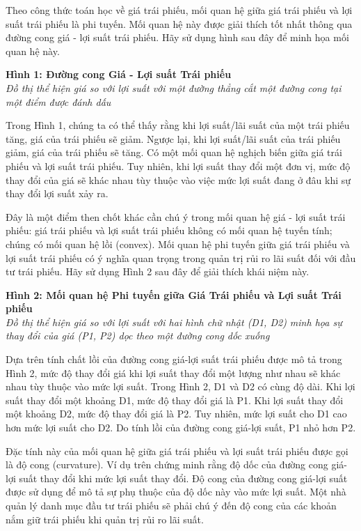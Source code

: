 Theo công thức toán học về giá trái phiếu, mối quan hệ giữa giá trái phiếu và lợi suất trái phiếu là phi tuyến. Mối quan hệ này được giải thích tốt nhất thông qua đường cong giá - lợi suất trái phiếu. Hãy sử dụng hình sau đây để minh họa mối quan hệ này.

\textbf{Hình 1: Đường cong Giá - Lợi suất Trái phiếu} \\
\textit{Đồ thị thể hiện giá so với lợi suất với một đường thẳng cắt một đường cong tại một điểm được đánh dấu}

Trong Hình 1, chúng ta có thể thấy rằng khi lợi suất/lãi suất của một trái phiếu tăng, giá của trái phiếu sẽ giảm. Ngược lại, khi lợi suất/lãi suất của trái phiếu giảm, giá của trái phiếu sẽ tăng. Có một mối quan hệ nghịch biến giữa giá trái phiếu và lợi suất trái phiếu. Tuy nhiên, khi lợi suất thay đổi một đơn vị, mức độ thay đổi của giá sẽ khác nhau tùy thuộc vào việc mức lợi suất đang ở đâu khi sự thay đổi lợi suất xảy ra.

Đây là một điểm then chốt khác cần chú ý trong mối quan hệ giá - lợi suất trái phiếu: giá trái phiếu và lợi suất trái phiếu không có mối quan hệ tuyến tính; chúng có mối quan hệ lồi (convex). Mối quan hệ phi tuyến giữa giá trái phiếu và lợi suất trái phiếu có ý nghĩa quan trọng trong quản trị rủi ro lãi suất đối với đầu tư trái phiếu. Hãy sử dụng Hình 2 sau đây để giải thích khái niệm này.

\textbf{Hình 2: Mối quan hệ Phi tuyến giữa Giá Trái phiếu và Lợi suất Trái phiếu} \\
\textit{Đồ thị thể hiện giá so với lợi suất với hai hình chữ nhật (D1, D2) minh họa sự thay đổi của giá (P1, P2) dọc theo một đường cong dốc xuống}

Dựa trên tính chất lồi của đường cong giá-lợi suất trái phiếu được mô tả trong Hình 2, mức độ thay đổi giá khi lợi suất thay đổi một lượng như nhau sẽ khác nhau tùy thuộc vào mức lợi suất. Trong Hình 2, D1 và D2 có cùng độ dài. Khi lợi suất thay đổi một khoảng D1, mức độ thay đổi giá là P1. Khi lợi suất thay đổi một khoảng D2, mức độ thay đổi giá là P2. Tuy nhiên, mức lợi suất cho D1 cao hơn mức lợi suất cho D2. Do tính lồi của đường cong giá-lợi suất, P1 nhỏ hơn P2.

Đặc tính này của mối quan hệ giữa giá trái phiếu và lợi suất trái phiếu được gọi là độ cong (curvature). Ví dụ trên chứng minh rằng độ dốc của đường cong giá-lợi suất thay đổi khi mức lợi suất thay đổi. Độ cong của đường cong giá-lợi suất được sử dụng để mô tả sự phụ thuộc của độ dốc này vào mức lợi suất. Một nhà quản lý danh mục đầu tư trái phiếu sẽ phải chú ý đến độ cong của các khoản nắm giữ trái phiếu khi quản trị rủi ro lãi suất.

